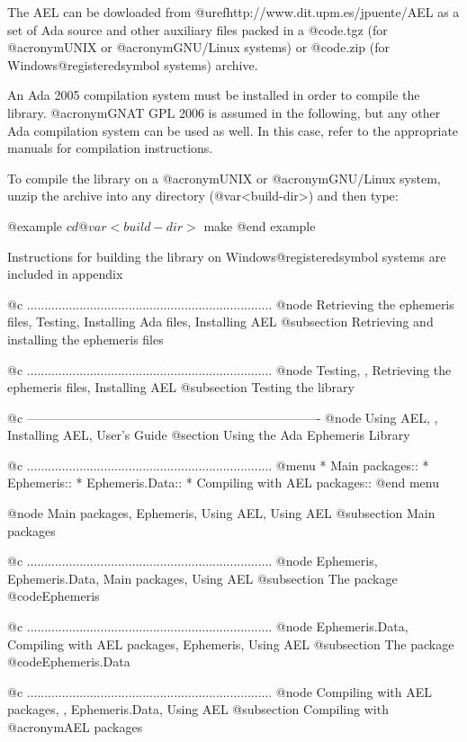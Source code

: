 The AEL can be dowloaded from @uref{http://www.dit.upm.es/jpuente/AEL}
as a set of Ada source and other auxiliary files packed in a
@code{.tgz} (for @acronym{UNIX} or @acronym{GNU}/Linux systems) or
@code{.zip} (for Windows@registeredsymbol{} systems) archive.

An Ada 2005 compilation system must be installed in order to compile
the library. @acronym{GNAT GPL 2006} is assumed in the following, but
any other Ada compilation system can be used as well. In this case,
refer to the appropriate manuals for compilation instructions.

To compile the library on a @acronym{UNIX} or @acronym{GNU}/Linux system,
unzip the archive into any directory (@var{<build-dir>}) and then type:

@example
$ cd @var{<build-dir>}
$ make
@end example

Instructions for building the library on Windows@registeredsymbol{}
systems are included in appendix 




@c ......................................................................
@node Retrieving the ephemeris files, Testing, Installing Ada files, Installing AEL
@subsection Retrieving and installing the ephemeris files

@c ......................................................................
@node Testing,  , Retrieving the ephemeris files, Installing AEL
@subsection Testing the library

@c ----------------------------------------------------------------------
@node Using AEL,  , Installing AEL, User's Guide
@section Using the Ada Ephemeris Library

@c ......................................................................
@menu
* Main packages::               
* Ephemeris::                   
* Ephemeris.Data::              
* Compiling with AEL packages::  
@end menu

@node Main packages, Ephemeris, Using AEL, Using AEL
@subsection Main packages

@c ......................................................................
@node Ephemeris, Ephemeris.Data, Main packages, Using AEL
@subsection The package @code{Ephemeris}


@c ......................................................................
@node Ephemeris.Data, Compiling with AEL packages, Ephemeris, Using AEL
@subsection The package @code{Ephemeris.Data}


@c ......................................................................
@node Compiling with AEL packages,  , Ephemeris.Data, Using AEL
@subsection Compiling with @acronym{AEL} packages


